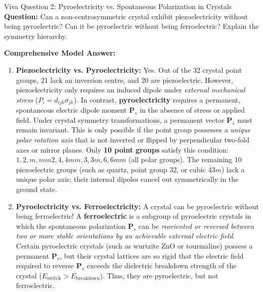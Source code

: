 \documentclass[11pt,a4paper]{article}
\begin{document}
\vspace{0.4cm}

\begin{checkpointbox}{Viva Question 2: Pyroelectricity vs. Spontaneous Polarization in Crystals}
\textbf{Question:} Can a non-centrosymmetric crystal exhibit piezoelectricity without being pyroelectric? Can it be pyroelectric without being ferroelectric? Explain the symmetry hierarchy.

\textbf{Comprehensive Model Answer:}
\begin{enumerate}[leftmargin=*]
    \item \textbf{Piezoelectricity vs. Pyroelectricity:}
    Yes. Out of the 32 crystal point groups, 21 lack an inversion centre, and 20 are piezoelectric. However, piezoelectricity only requires an induced dipole under \emph{external mechanical stress} ($P_i = d_{ijk}\sigma_{jk}$).
    In contrast, \textbf{pyroelectricity} requires a permanent, spontaneous electric dipole moment $\mathbf{P}_s$ in the absence of stress or applied field. Under crystal symmetry transformations, a permanent vector $\mathbf{P}_s$ must remain invariant. This is only possible if the point group possesses a \emph{unique polar rotation axis} that is not inverted or flipped by perpendicular two-fold axes or mirror planes.
    Only \textbf{10 point groups} satisfy this condition: $1, 2, m, mm2, 4, 4mm, 3, 3m, 6, 6mm$ (all polar groups). The remaining 10 piezoelectric groups (such as quartz, point group $32$, or cubic $\bar{4}3m$) lack a unique polar axis; their internal dipoles cancel out symmetrically in the ground state.
    \item \textbf{Pyroelectricity vs. Ferroelectricity:}
    A crystal can be pyroelectric without being ferroelectric!
    A \textbf{ferroelectric} is a subgroup of pyroelectric crystals in which the spontaneous polarization $\mathbf{P}_s$ can be \emph{reoriented or reversed between two or more stable orientations by an achievable external electric field}.
    Certain pyroelectric crystals (such as wurtzite $\text{ZnO}$ or tourmaline) possess a permanent $\mathbf{P}_s$, but their crystal lattices are so rigid that the electric field required to reverse $\mathbf{P}_s$ exceeds the dielectric breakdown strength of the crystal ($E_{\text{switch}} > E_{\text{breakdown}}$). Thus, they are pyroelectric, but not ferroelectric.
\end{enumerate}
\end{checkpointbox}

\newpage
\end{document}
